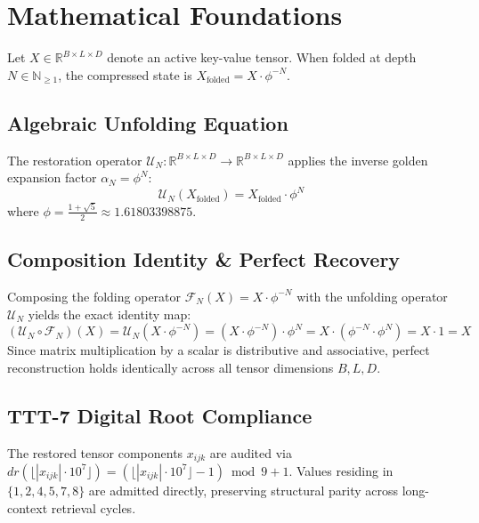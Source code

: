 \section{Mathematical Foundations}
Let $X \in \mathbb{R}^{B \times L \times D}$ denote an active key-value tensor. When folded at depth $N \in \mathbb{N}_{\ge 1}$, the compressed state is $X_{\text{folded}} = X \cdot \phi^{-N}$.

\subsection{Algebraic Unfolding Equation}
The restoration operator $\mathcal{U}_N: \mathbb{R}^{B \times L \times D} \to \mathbb{R}^{B \times L \times D}$ applies the inverse golden expansion factor $\alpha_N = \phi^N$:
\begin{equation}
    \mathcal{U}_N(X_{\text{folded}}) = X_{\text{folded}} \cdot \phi^N
\end{equation}
where $\phi = \frac{1+\sqrt{5}}{2} \approx 1.61803398875$.

\subsection{Composition Identity & Perfect Recovery}
Composing the folding operator $\mathcal{F}_N(X) = X \cdot \phi^{-N}$ with the unfolding operator $\mathcal{U}_N$ yields the exact identity map:
\begin{equation}
    (\mathcal{U}_N \circ \mathcal{F}_N)(X) = \mathcal{U}_N(X \cdot \phi^{-N}) = (X \cdot \phi^{-N}) \cdot \phi^N = X \cdot (\phi^{-N} \cdot \phi^N) = X \cdot 1 = X
\end{equation}
Since matrix multiplication by a scalar is distributive and associative, perfect reconstruction holds identically across all tensor dimensions $B, L, D$.

\subsection{TTT-7 Digital Root Compliance}
The restored tensor components $x_{ijk}$ are audited via $dr(\lfloor |x_{ijk}| \cdot 10^7 \rfloor) = (\lfloor |x_{ijk}| \cdot 10^7 \rfloor - 1) \bmod 9 + 1$. Values residing in $\{1, 2, 4, 5, 7, 8\}$ are admitted directly, preserving structural parity across long-context retrieval cycles.
